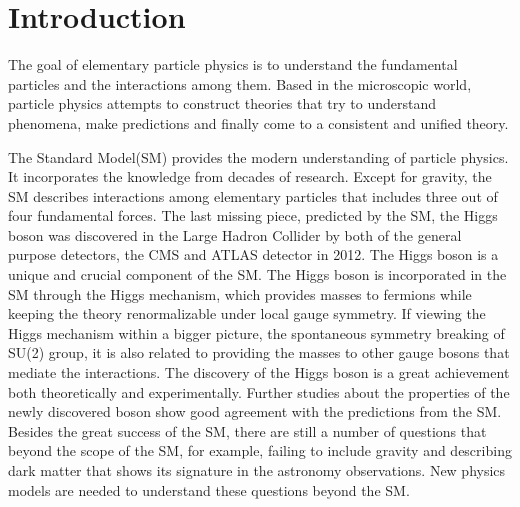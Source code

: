 
\chapter{Introduction}

The goal of elementary particle physics is to understand the fundamental particles and the interactions among them. Based in the microscopic world, particle physics attempts to construct theories that try to understand phenomena, make predictions and finally come to a consistent and unified theory. 

The Standard Model(SM) provides the modern understanding of particle physics. It incorporates the knowledge from decades of research. Except for gravity, the SM describes interactions among elementary particles that includes three out of four fundamental forces. The last missing piece, predicted by the SM, the Higgs boson was discovered in the Large Hadron Collider by both of the general purpose detectors, the CMS and ATLAS detector in 2012. The Higgs boson is a unique and crucial component of the SM. The Higgs boson is incorporated in the SM through the Higgs mechanism, which provides masses to fermions while keeping the theory renormalizable under local gauge symmetry. If viewing the Higgs mechanism within a bigger picture, the spontaneous symmetry breaking of SU(2) group, it is also related to providing the masses to other gauge bosons that mediate the interactions. The discovery of the Higgs boson is a great achievement both theoretically and experimentally. Further studies about the properties of the newly discovered boson show good agreement with the predictions from the SM. Besides the great success of the SM, there are still a number of questions that beyond the scope of the SM, for example, failing to include gravity and describing dark matter that shows its signature in the astronomy observations. New physics models are needed to understand these questions beyond the SM.  

